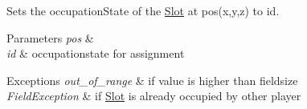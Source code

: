Sets the occupation\-State of the \hyperlink{structPlayingField_1_1Slot}{Slot} at pos(x,y,z) to id. 


\begin{DoxyParams}{Parameters}
{\em pos} & \\
\hline
{\em id} & occupationstate for assignment \\
\hline
\end{DoxyParams}

\begin{DoxyExceptions}{Exceptions}
{\em out\-\_\-of\-\_\-range} & if value is higher than fieldsize \\
\hline
{\em Field\-Exception} & if \hyperlink{structPlayingField_1_1Slot}{Slot} is already occupied by other player \\
\hline
\end{DoxyExceptions}
